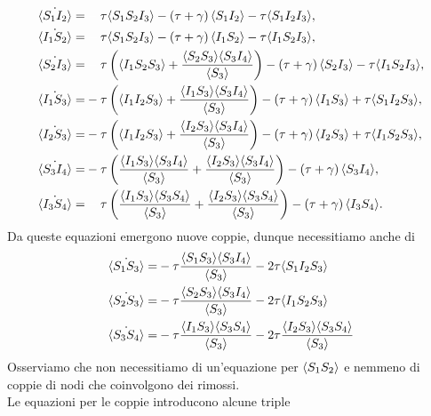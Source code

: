   \begin{equation*}
 \begin{aligned}
 \dot{\angol{S_1I_2}} =&\spa \tau\angol{S_1S_2I_3} - \tonde{ \tau + \gamma} \angol{S_1 I_2} -\tau\angol{S_1I_2I_3},\\
\dot{\angol{I_1S_2}} =&\spa\tau\angol{S_1S_2I_3} - \tonde{ \tau + \gamma} \angol{I_1 S_2} -\tau\angol{I_1S_2I_3},\\
\dot{\angol{S_2I_3}} =&\spa \tau\tonde{\angol{I_1S_2S_3} +\frac{\angol{S_2S_3}\angol{S_3I_4}}{\angol{S_3}}} - \tonde{ \tau + \gamma} \angol{S_2 I_3} -\tau\angol{I_1S_2I_3},\\
\dot{\angol{I_1S_3}} =&- \tau\tonde{\angol{I_1I_2S_3} +\frac{\angol{I_1S_3}\angol{S_3I_4}}{\angol{S_3}}} - \tonde{ \tau + \gamma} \angol{I_1 S_3} +\tau\angol{S_1I_2S_3},\\ 
\dot{\angol{I_2S_3}} =&- \tau\tonde{\angol{I_1I_2S_3} +\frac{\angol{I_2S_3}\angol{S_3I_4}}{\angol{S_3}}}- \tonde{ \tau + \gamma} \angol{I_2 S_3} +\tau\angol{I_1S_2S_3},\\ 
\dot{\angol{S_3I_4}} =&- \tau\tonde{\frac{\angol{I_1S_3}\angol{S_3I_4}}{\angol{S_3}}+ \frac{\angol{I_2S_3}\angol{S_3I_4}}{\angol{S_3}}} - \tonde{ \tau + \gamma} \angol{S_3 I_4}, \\ 
\dot{\angol{I_3S_4}} =& \spa \tau\tonde{\frac{\angol{I_1S_3}\angol{S_3S_4}}{\angol{S_3}}+\frac{\angol{I_2S_3}\angol{S_3S_4}}{\angol{S_3}}} - \tonde{ \tau + \gamma} \angol{I_3 S_4}.\\ 
\end{aligned}
 \end{equation*}
 Da queste equazioni emergono nuove coppie, dunque necessitiamo anche di 
 \begin{equation*}
\begin{aligned}
	\dot{\langle S_1S_3 \rangle}=& - \tau \frac{\langle S_1S_3 \rangle\langle S_3I_4 \rangle}{\langle S_3 \rangle}- 2\tau \langle S_1I_2S_3 \rangle\\
	\dot{\langle S_2S_3 \rangle}=& -\tau \frac{\langle S_2S_3 \rangle\langle S_3I_4 \rangle}{\langle S_3 \rangle} -2\tau \langle I_1S_2S_3 \rangle\\
	\dot{\langle S_3S_4 \rangle}=& -\tau \frac{\langle I_1S_3 \rangle\langle S_3S_4 \rangle}{\langle S_3 \rangle}-2\tau \frac{\langle I_2S_3 \rangle\langle S_3 S_4 \rangle}{\langle S_3 \rangle}
\end{aligned} 	
 \end{equation*}
 Osserviamo che non necessitiamo di un'equazione per $\langle S_1S_2 \rangle$ e nemmeno di coppie di nodi che coinvolgono dei rimossi.\\
 Le equazioni per le coppie introducono alcune triple
